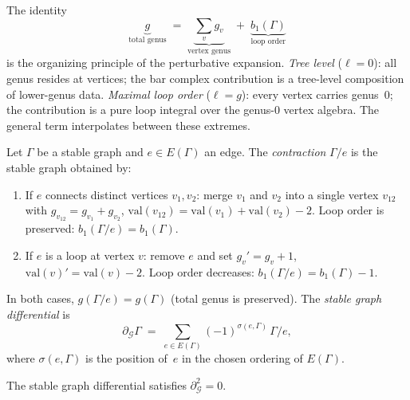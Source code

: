 \begin{remark}%
\label{rem:genus-decomposition-triangle}
The identity
\begin{equation}\label{eq:genus-triangle}
\underbrace{g}_{\text{total genus}}
\;=\;
\underbrace{\textstyle\sum_v g_v}_{\text{vertex genus}}
\;+\;
\underbrace{b_1(\Gamma)}_{\text{loop order}}
\end{equation}
is the organizing principle of the perturbative expansion.
\emph{Tree level} ($\ell = 0$): all genus resides at vertices; the
bar complex contribution is a tree-level composition of lower-genus
data.
\emph{Maximal loop order} ($\ell = g$): every vertex carries
genus~$0$; the contribution is a pure loop integral over the genus-$0$
vertex algebra. The general term interpolates between these extremes.
\end{remark}

\begin{definition}%
\label{def:edge-contraction}
Let $\Gamma$ be a stable graph and $e \in E(\Gamma)$ an edge.
The \emph{contraction} $\Gamma / e$ is the stable graph obtained by:
\begin{enumerate}[label=\textup{(\alph*)}]
\item If $e$ connects distinct vertices $v_1, v_2$:
 merge $v_1$ and $v_2$ into a single vertex $v_{12}$ with
 $g_{v_{12}} = g_{v_1} + g_{v_2}$,
 $\mathrm{val}(v_{12}) = \mathrm{val}(v_1) + \mathrm{val}(v_2) - 2$.
 Loop order is preserved: $b_1(\Gamma/e) = b_1(\Gamma)$.
\item If $e$ is a loop at vertex $v$:
 remove $e$ and set $g_{v}' = g_v + 1$,
 $\mathrm{val}(v)' = \mathrm{val}(v) - 2$.
 Loop order decreases: $b_1(\Gamma/e) = b_1(\Gamma) - 1$.
\end{enumerate}
In both cases, $g(\Gamma/e) = g(\Gamma)$ (total genus is preserved).
The \emph{stable graph differential} is
\begin{equation}\label{eq:stable-graph-diff}
\partial_{\mathcal{G}}\Gamma
\;=\;
\sum_{e \in E(\Gamma)}
(-1)^{\sigma(e,\Gamma)}\,\Gamma / e,
\end{equation}
where $\sigma(e,\Gamma)$ is the position of~$e$ in the chosen
ordering of $E(\Gamma)$.
\end{definition}

\begin{lemma}[$\partial_{\mathcal{G}}^2 = 0$;
\ClaimStatusProvedHere]\label{lem:stable-graph-d-squared}
The stable graph differential satisfies $\partial_{\mathcal{G}}^2 = 0$.
\end{lemma}

